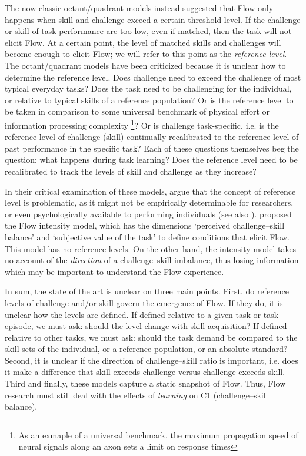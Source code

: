 \documentclass{frontierstyle/frontiersSCNS}
\newcommand{\hl}{\textcolor{red!80}}
\begin{document}
The now-classic octant/quadrant models \citep{Massimini1988} instead suggested that Flow only happens when skill and challenge exceed a certain threshold level. \hl{If the challenge or skill of task performance are too low, even if matched, then the task will not elicit Flow. At a certain point, the level of matched skills and challenges will become enough to elicit Flow; we will refer to this point as the {\it reference level}. The octant/quadrant models have been criticized because it is unclear how to determine the reference level. Does challenge need to exceed the challenge of most typical everyday tasks? Does the task need to be challenging for the individual, or relative to typical skills of a reference population? Or is the reference level to be taken in comparison to some universal benchmark of physical effort or information processing complexity \footnote{As an exmaple of a universal benchmark, the maximum propagation speed of neural signals along an axon sets a limit on response times}?} Or is challenge task-specific, \hl{i.e. is the reference level of challenge (skill) continually recalibrated to the reference level of past performance in the specific task? Each of these questions themselves beg the question:} what happens during task learning? Does the reference level need to be recalibrated to track the levels of skill and challenge as they increase?

In their critical examination of these models, \cite{Keller2012} argue that \hl{the concept of reference level is problematic, as it} might not be empirically determinable for researchers, or even psychologically available to performing individuals (see also \cite{Moneta2012}). \hl{\citet[pp-56]{Keller2012} proposed the Flow intensity model, which has the dimensions `perceived challenge--skill balance' and `subjective value of the task' to define conditions that elicit Flow. This model has no reference levels. On the other hand, the intensity model takes no account of the {\it direction} of a challenge--skill imbalance, thus losing information which may be important to understand the Flow experience.}

\hl{In sum, the state of the art is unclear on three main points. First, do reference levels of challenge and/or skill govern the emergence of Flow. If they do, it is unclear how the levels are defined. If defined relative to a given task or task episode, we must ask: should the level change with skill acquisition? If defined relative to other tasks, we must ask: should the task demand be compared to the skill sets of the individual, or a reference population, or an absolute standard? Second, it is unclear if the direction of challenge--skill ratio is important, i.e. does it make a difference that skill exceeds challenge versus challenge exceeds skill. Third and finally, these models capture a static snapshot of Flow. Thus, Flow research must still deal with the effects of \textit{learning} on {\sf C1} (challenge--skill balance).}
\end{document}
